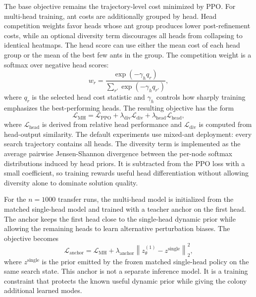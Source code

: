 \documentclass[11pt]{article}
\begin{document}
The base objective remains the trajectory-level cost minimized by PPO.
For multi-head training, ant costs are additionally grouped by head.
Head competition weights favor heads whose ant group produces lower post-refinement costs, while an optional diversity term discourages all heads from collapsing to identical heatmaps.
The head score can use either the mean cost of each head group or the mean of the best few ants in the group.
The competition weight is a softmax over negative head scores:
\begin{equation}
w_r
=
\frac{
\exp(-\gamma_h q_r)
}{
\sum_{r'} \exp(-\gamma_h q_{r'})
},
\end{equation}
where $q_r$ is the selected head cost statistic and $\gamma_h$ controls how sharply training emphasizes the best-performing heads.
The resulting objective has the form
\begin{equation}
\mathcal{L}_{\mathrm{MH}}
= \mathcal{L}_{\mathrm{PPO}}
+ \lambda_{\mathrm{div}} \mathcal{L}_{\mathrm{div}}
+ \lambda_{\mathrm{head}} \mathcal{L}_{\mathrm{head}},
\end{equation}
where $\mathcal{L}_{\mathrm{head}}$ is derived from relative head performance and $\mathcal{L}_{\mathrm{div}}$ is computed from head-output similarity.
The default experiments use mixed-ant deployment: every search trajectory contains all heads.
The diversity term is implemented as the average pairwise Jensen-Shannon divergence between the per-node softmax distributions induced by head priors.
It is subtracted from the PPO loss with a small coefficient, so training rewards useful head differentiation without allowing diversity alone to dominate solution quality.

For the $n=1000$ transfer runs, the multi-head model is initialized from the matched single-head model and trained with a teacher anchor on the first head.
The anchor keeps the first head close to the single-head dynamic prior while allowing the remaining heads to learn alternative perturbation biases.
The objective becomes
\begin{equation}
\mathcal{L}_{\mathrm{anchor}}
=
\mathcal{L}_{\mathrm{MH}}
+
\lambda_{\mathrm{anchor}}
\left\|z^{(1)}_\theta - z^{\mathrm{single}}\right\|_2^2,
\end{equation}
where $z^{\mathrm{single}}$ is the prior emitted by the frozen matched single-head policy on the same search state.
This anchor is not a separate inference model.
It is a training constraint that protects the known useful dynamic prior while giving the colony additional learned modes.
\end{document}
